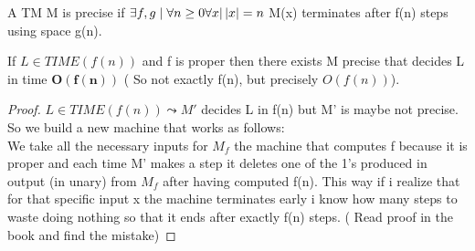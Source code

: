 \begin{definition}
    A TM M is precise if $\exists f,g \mid \forall n\geq 0 \forall x | \left\lvert x\right\rvert = n $ M(x) terminates after f(n) steps using space g(n). 
\end{definition}
\begin{property}
    If $L \in TIME(f(n))$ and f is proper then there exists M precise that decides L in time $\mathbf{O(f(n))}$ ( So not exactly f(n), but precisely $O(f(n))$).
    \begin{proof}
        $L \in TIME(f(n)) \leadsto M'$ decides L in f(n) but M' is maybe not precise. So we build a new machine that works as follows:\\
        We take all the necessary inputs for $M_f$ the machine that computes f because it is proper and each time M' makes a step it deletes one of the 1's produced in output (in unary) from $M_f$ after having computed f(n). This way if i realize that for that specific input x the machine terminates early i know how many steps to waste doing nothing so that it ends after exactly f(n) steps. ( Read proof in the book and find the mistake)
    \end{proof}
\end{property}
